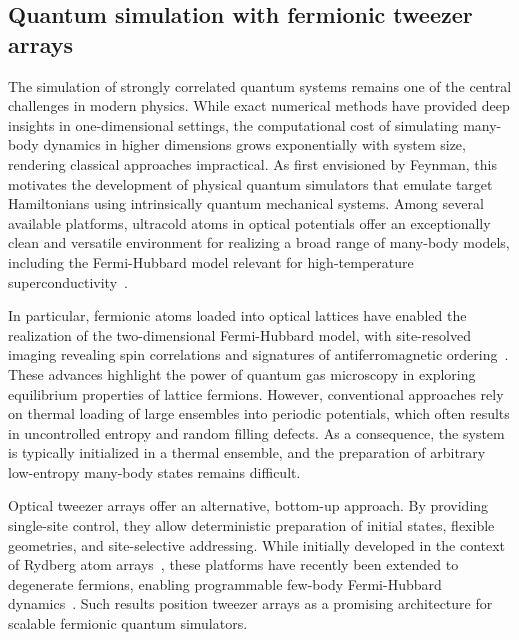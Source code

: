 
\subsection{Quantum simulation with fermionic tweezer arrays}

The simulation of strongly correlated quantum systems remains one of the central challenges in modern physics. While exact numerical methods have provided deep insights in one-dimensional settings, the computational cost of simulating many-body dynamics in higher dimensions grows exponentially with system size, rendering classical approaches impractical. As first envisioned by Feynman, this motivates the development of physical quantum simulators that emulate target Hamiltonians using intrinsically quantum mechanical systems. Among several available platforms, ultracold atoms in optical potentials offer an exceptionally clean and versatile environment for realizing a broad range of many-body models, including the Fermi-Hubbard model relevant for high-temperature superconductivity~\cite{esslinger_fermi-hubbard_2010, gross_quantum_2017}.

In particular, fermionic atoms loaded into optical lattices have enabled the realization of the two-dimensional Fermi-Hubbard model, with site-resolved imaging revealing spin correlations and signatures of antiferromagnetic ordering~\cite{parsons_site-resolved_2016, boll_spin-_2016}. These advances highlight the power of quantum gas microscopy in exploring equilibrium properties of lattice fermions. However, conventional approaches rely on thermal loading of large ensembles into periodic potentials, which often results in uncontrolled entropy and random filling defects. As a consequence, the system is typically initialized in a thermal ensemble, and the preparation of arbitrary low-entropy many-body states remains difficult.

Optical tweezer arrays offer an alternative, bottom-up approach. By providing single-site control, they allow deterministic preparation of initial states, flexible geometries, and site-selective addressing. While initially developed in the context of Rydberg atom arrays~\cite{browaeys_many-body_2020}, these platforms have recently been extended to degenerate fermions, enabling programmable few-body Fermi-Hubbard dynamics~\cite{spar_realization_2022, yan_two-dimensional_2022}. Such results position tweezer arrays as a promising architecture for scalable fermionic quantum simulators.

